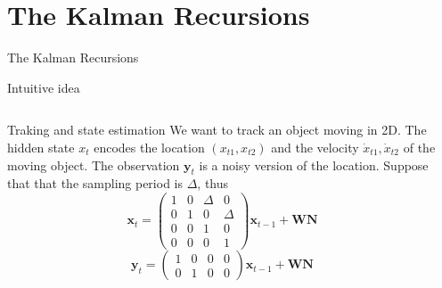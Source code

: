 \documentclass[11pt]{beamer}
\begin{document}
\section{The Kalman Recursions}

\begin{frame}
\begin{center}
\Huge
The Kalman Recursions
\end{center}
\end{frame}

\begin{frame}{Intuitive idea \cite{pml2Book}}
\small
\begin{columns}
\begin{column}{0.5\textwidth}
\begin{alertblock}{Traking and state estimation}
We want to track an object moving in 2D. The hidden state $x_{t}$ encodes the location $(x_{t1},x_{t2})$ and the velocity $\dot{x}_{t1},\dot{x}_{t2}$ of the moving object. The observation $\textbf{y}_{t}$ is a noisy version of the location. Suppose that that the sampling period is $\Delta$, thus
\begin{equation}
\bm{x}_{t}= \begin{pmatrix} 1 & 0 & \Delta & 0 \\ 0 & 1 & 0 & \Delta \\ 0 & 0 & 1 & 0 \\  0 & 0 & 0 & 1   \end{pmatrix} \bm{x}_{t-1}+\textbf{WN}
\end{equation}
\begin{equation}
\bm{y}_{t}= \begin{pmatrix} 1 & 0 & 0 & 0 \\ 0 & 1 & 0 & 0  \end{pmatrix} \bm{x}_{t-1}+\textbf{WN}
\end{equation}
\end{alertblock}
\end{column}
\begin{column}{0.5\textwidth}  %
    \begin{center}

\end{center}
\end{column}
\end{columns}
\end{frame}
\end{document}
